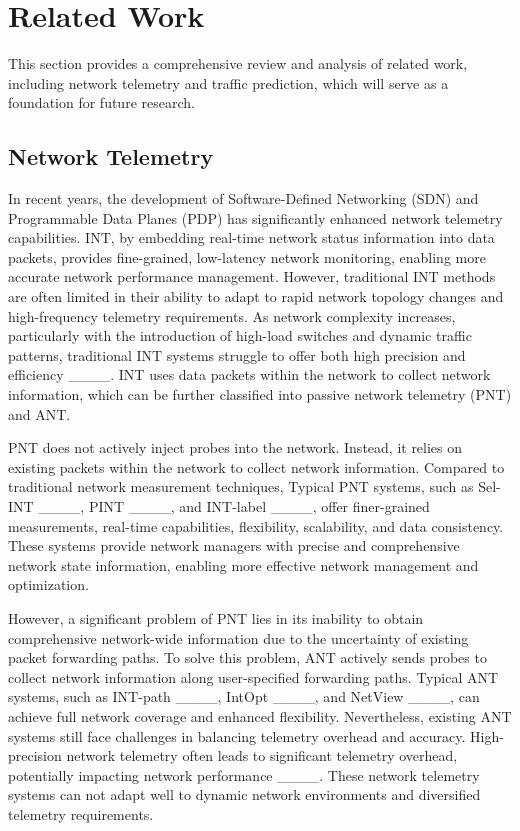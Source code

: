 \section{Related Work}
\label{section2}
This section provides a comprehensive review and analysis of related work, including network telemetry and traffic prediction, which will serve as a foundation for future research.

\subsection{Network Telemetry}
In recent years, the development of Software-Defined Networking (SDN) and Programmable Data Planes (PDP) has significantly enhanced network telemetry capabilities. INT, by embedding real-time network status information into data packets, provides fine-grained, low-latency network monitoring, enabling more accurate network performance management. However, traditional INT methods are often limited in their ability to adapt to rapid network topology changes and high-frequency telemetry requirements. As network complexity increases, particularly with the introduction of high-load switches and dynamic traffic patterns, traditional INT systems struggle to offer both high precision and efficiency ____. INT uses data packets within the network to collect network information, which can be further classified into passive network telemetry (PNT) and ANT.

PNT does not actively inject probes into the network. Instead, it relies on existing packets within the network to collect network information. Compared to traditional network measurement techniques, 
Typical PNT systems, such as Sel-INT ____, PINT ____, and INT-label ____, offer finer-grained measurements, real-time capabilities, flexibility, scalability, and data consistency. These systems provide network managers with precise and comprehensive network state information, enabling more effective network management and optimization.

However, a significant problem of PNT lies in its inability to obtain comprehensive network-wide information due to the uncertainty of existing packet forwarding paths. To solve this problem, ANT actively sends probes to collect network information along user-specified forwarding paths. Typical ANT systems, such as INT-path ____, IntOpt ____, and NetView ____, can achieve full network coverage and enhanced flexibility. 
Nevertheless, existing ANT systems still face challenges in balancing telemetry overhead and accuracy. High-precision network telemetry often leads to significant telemetry overhead, potentially impacting network performance ____. 
These network telemetry systems can not adapt well to dynamic network environments and diversified telemetry requirements.

